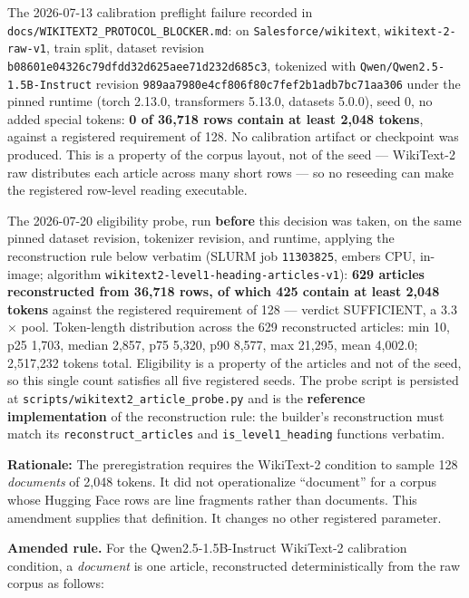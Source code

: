 The 2026-07-13 calibration preflight failure recorded in \texttt{docs/\allowbreak{}WIKITEXT2\_PROTOCOL\_BLOCKER.md}: on \texttt{Salesforce/\allowbreak{}wikitext}, \texttt{wikitext-\allowbreak{}2-\allowbreak{}raw-\allowbreak{}v1}, train split, dataset revision \texttt{b08601e04326c79dfdd32d625aee71d232d685c3}, tokenized with \texttt{Qwen/\allowbreak{}Qwen2.5-\allowbreak{}1.5B-\allowbreak{}Instruct} revision \texttt{989aa7980e4cf806f80c7fef2b1adb7bc71aa306} under the pinned runtime (torch 2.13.0, transformers 5.13.0, datasets 5.0.0), seed 0, no added special tokens: \textbf{0 of 36,718 rows contain at least 2,048 tokens}, against a registered requirement of 128. No calibration artifact or checkpoint was produced. This is a property of the corpus layout, not of the seed --- WikiText-2 raw distributes each article across many short rows --- so no reseeding can make the registered row-level reading executable.

The 2026-07-20 eligibility probe, run \textbf{before} this decision was taken, on the same pinned dataset revision, tokenizer revision, and runtime, applying the reconstruction rule below verbatim (SLURM job \texttt{11303825}, embers CPU, in-image; algorithm \texttt{wikitext2-\allowbreak{}level1-\allowbreak{}heading-\allowbreak{}articles-\allowbreak{}v1}): \textbf{629 articles reconstructed from 36,718 rows, of which 425 contain at least 2,048 tokens} against the registered requirement of 128 --- verdict SUFFICIENT, a 3.3$\times$ pool. Token-length distribution across the 629 reconstructed articles: min 10, p25 1,703, median 2,857, p75 5,320, p90 8,577, max 21,295, mean 4,002.0; 2,517,232 tokens total. Eligibility is a property of the articles and not of the seed, so this single count satisfies all five registered seeds. The probe script is persisted at \texttt{scripts/\allowbreak{}wikitext2\_article\_probe.py} and is the \textbf{reference implementation} of the reconstruction rule: the builder's reconstruction must match its \texttt{reconstruct\_articles} and \texttt{is\_level1\_heading} functions verbatim.

\textbf{Rationale:} The preregistration requires the WikiText-2 condition to sample 128 \emph{documents} of 2,048 tokens. It did not operationalize ``document'' for a corpus whose Hugging Face rows are line fragments rather than documents. This amendment supplies that definition. It changes no other registered parameter.

\textbf{Amended rule.} For the Qwen2.5-1.5B-Instruct WikiText-2 calibration condition, a \emph{document} is one article, reconstructed deterministically from the raw corpus as follows:

